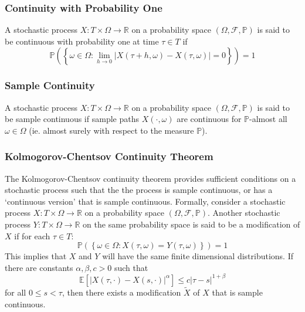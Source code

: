 \documentclass[11pt]{report} %
\begin{document}
\subsubsection{Continuity with Probability One}

A stochastic process $X: T \times \Omega \to \mathbb{R}$ on a probability space $\left(\Omega, \mathcal{F}, \mathbb{P}\right)$ is said to be continuous with probability one at time $\tau \in T$ if
\begin{equation}
\mathbb{P}\left(\left\{\omega\in\Omega : \lim_{h \to 0}\left|X\left(\tau + h, \omega\right) - X\left(\tau, \omega\right)\right| = 0 \right\}\right) = 1
\end{equation}

\subsubsection{Sample Continuity}

A stochastic process $X: T \times \Omega \to \mathbb{R}$ on a probability space $\left(\Omega, \mathcal{F}, \mathbb{P}\right)$ is said to be sample continuous if sample paths $X\left(\cdot, \omega\right)$ are continuous for $\mathbb{P}$-almost all $\omega \in \Omega$ (ie. almost surely with respect to the measure $\mathbb{P}$).

\subsubsection{Kolmogorov-Chentsov Continuity Theorem \cite{Bauer1996}}

The Kolmogorov-Chentsov continuity theorem provides sufficient conditions on a stochastic process such that the the process is sample continuous, or has a `continuous version' that is sample continuous. Formally, consider a stochastic process $X: T \times \Omega \to \mathbb{R}$ on a probability space $\left(\Omega, \mathcal{F}, \mathbb{P}\right)$. Another stochastic process $Y: T \times \Omega \to \mathbb{R}$ on the same probability space is said to be a modification of $X$ if for each $\tau \in T$:
\begin{equation}
\mathbb{P}\left(\left\{\omega \in \Omega: X\left(\tau, \omega\right) = Y\left(\tau, \omega\right)\right\}\right) = 1
\end{equation}
This implies that $X$ and $Y$ will have the same finite dimensional distributions. If there are constants $\alpha, \beta, c >  0$ such that
\begin{equation}
\mathbb{E}\left[\left|X\left(\tau, \cdot\right) - X\left(s, \cdot\right)\right|^{\alpha}\right] \leq c\left|\tau - s\right|^{1 + \beta}
\end{equation}
for all $0 \leq s < \tau$, then there exists a modification $\widetilde{X}$ of $X$ that is sample continuous.
\end{document}
